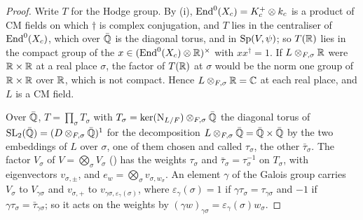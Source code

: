 \begin{proof}
Write $T$ for the Hodge group. By (i), $\operatorname{End}^{0}(X_{c})
=K_{c}^{+}\otimes k_{c}$ is a product of CM fields on which $\dagger$ is
complex conjugation, and $T$ lies in the centraliser of $\operatorname{End}^{0}(X_{c})$,
which over $\bar{\mathbb{Q}}$ is the diagonal torus, and in $\operatorname{Sp}(V,\psi)$; so
$T(\mathbb{R})$ lies in the compact group of the $x\in(\operatorname{End}^{0}(X_{c})\otimes\mathbb{R})
^{\times}$ with $xx^{\dagger}=1$. If $L\otimes_{F,\sigma}\mathbb{R}$ were
$\mathbb{R}\times\mathbb{R}$ at a real place $\sigma$, the factor of $T(\mathbb{R})$ at $\sigma$
would be the norm one group of $\mathbb{R}\times\mathbb{R}$ over $\mathbb{R}$, which is not
compact. Hence $L\otimes_{F,\sigma}\mathbb{R}=\mathbb{C}$ at each real place, and $L$ is a
CM field.

Over $\bar{\mathbb{Q}}$, $T=\prod_{\sigma}T_{\sigma}$ with $T_{\sigma}
=\ker(\mathrm{N}_{L/F})\otimes_{F,\sigma}\bar{\mathbb{Q}}$ the diagonal torus of
$\operatorname{SL}_{2}(\bar{\mathbb{Q}})=(D\otimes_{F,\sigma}\bar{\mathbb{Q}})^{1}$ for the decomposition
$L\otimes_{F,\sigma}\bar{\mathbb{Q}}=\bar{\mathbb{Q}}\times\bar{\mathbb{Q}}$ by the two embeddings
of $L$ over $\sigma$, one of them chosen and called $\tau_{\sigma}$, the
other $\bar{\tau}_{\sigma}$. The factor $V_{\sigma}$ of
$V=\bigotimes_{\sigma}V_{\sigma}$ () has the weights
$\tau_{\sigma}$ and $\bar{\tau}_{\sigma}=\tau_{\sigma}^{-1}$ on $T_{\sigma}$,
with eigenvectors $v_{\sigma,\pm}$, and $e_{w}=\bigotimes_{\sigma}
v_{\sigma,w_{\sigma}}$. An element $\gamma$ of the Galois group carries
$V_{\sigma}$ to $V_{\gamma\sigma}$ and $v_{\sigma,+}$ to
$v_{\gamma\sigma,\varepsilon_{\gamma}(\sigma)}$, where
$\varepsilon_{\gamma}(\sigma)=1$ if $\gamma\tau_{\sigma}=\tau_{\gamma\sigma}$
and $-1$ if $\gamma\tau_{\sigma}=\bar{\tau}_{\gamma\sigma}$; so it acts on
the weights by $(\gamma w)_{\gamma\sigma}=\varepsilon_{\gamma}(\sigma)
w_{\sigma}$.


\end{proof}
